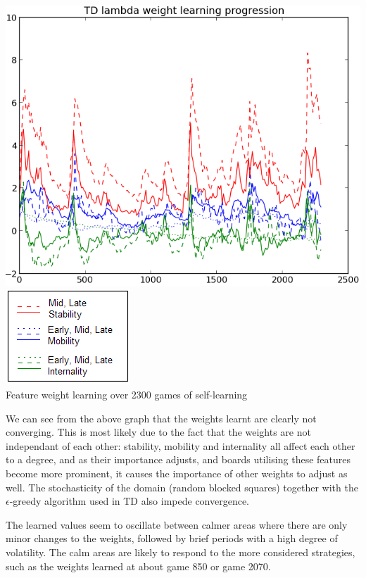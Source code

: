 \documentclass[10pt]{report}
\begin{document}
\begin{multicols}{2}
\begin{center}
\includegraphics[scale=0.40]{longgraph.png}\\
\includegraphics[scale=0.50]{legend.PNG}\\
Feature weight learning over 2300 games of self-learning
\end{center}

We can see from the above graph that the weights learnt are clearly not converging. This is most likely due to the fact that the weights are not independant of each other: stability, mobility and internality all affect each other to a degree, and as their importance adjusts, and boards utilising these features become more prominent, it causes the importance of other weights to adjust as well. The stochasticity of the domain (random blocked squares) together with the $\epsilon$-greedy algorithm used in TD also impede convergence.

The learned values seem to oscillate between calmer areas where there are only minor changes to the weights, followed by brief periods with a high degree of volatility. The calm areas are likely to respond to the more considered strategies, such as the weights learned at about game 850 or game 2070.


\end{multicols}
\end{document}
